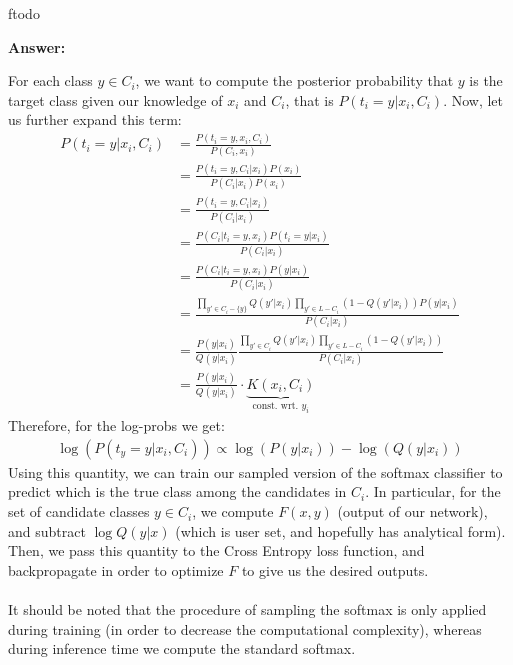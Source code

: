 ƒtodo\documentclass{article}
\newenvironment{QandA}{\begin{enumerate}[label=\arabic*.]}{\end{enumerate}}
\newenvironment{ListAlph}{\begin{enumerate}[label=(\alph*)]}{\end{enumerate}}
\newenvironment{answer}{\par\normalfont \textbf{Answer:}}{}
\newcommand{\g}{\vert}
\begin{document}
\begin{QandA}
\begin{answer}
\begin{ListAlph}
            For each class $y \in C_i$, we want to compute the posterior probability that $y$ is the target class given our knowledge of $x_i$ and $C_i$, that is $P(t_i = y \g x_i, C_i)$. Now, let us further expand this term:
            \begin{align*}
                P(t_i = y \g x_i, C_i) &= \frac{P(t_i = y, x_i, C_i)}{P(C_i, x_i)} \\
                &= \frac{P(t_i = y, C_i \g x_i) P(x_i)}{P(C_i \g x_i) P(x_i)} \\
                &= \frac{P(t_i = y, C_i \g x_i)}{P(C_i \g x_i)} \\
                &= \frac{P(C_i \g t_i = y, x_i) P(t_i = y \g x_i)}{P(C_i \g x_i)} \\
                &= \frac{P(C_i \g t_i = y, x_i) P(y \g x_i)}{P(C_i \g x_i)} \\
                &= \frac{\displaystyle \prod_{y' \in C_i - \{y\}} Q(y' \g x_i) \prod_{y' \in L - C_i} (1 - Q(y' \g x_i)) P(y \g x_i) }{P(C_i \g x_i)} \\
                &= \frac{P(y \g x_i)}{Q(y \g x_i)} \frac{\displaystyle \prod_{y' \in C_i } Q(y' \g x_i) \prod_{y' \in L - C_i} (1 - Q(y' \g x_i)) }{P(C_i \g x_i)} \\
                &= \frac{P(y \g x_i)}{Q(y \g x_i)} \cdot \underbrace{K(x_i, C_i)}_{\text{const. wrt. } y_i}
            \end{align*} 
            Therefore, for the log-probs we get:
            \begin{align*}
                \log (P(t_y = y \g x_i, C_i)) \propto \log (P(y \g x_i)) - \log (Q(y \g x_i)) 
            \end{align*}
            Using this quantity, we can train our sampled version of the softmax classifier to predict which is the true class among the candidates in $C_i$. In particular, for the set of candidate classes $y \in C_i$, we compute $F(x, y)$ (output of our network), and subtract $\log Q(y \g x)$ (which is user set, and hopefully has analytical form). Then, we pass this quantity to the Cross Entropy loss function, and backpropagate in order to optimize $F$ to give us the desired outputs. \\\\
            It should be noted that the procedure of sampling the softmax is only applied during training (in order to decrease the computational complexity), whereas during inference time we compute the standard softmax.


\end{ListAlph}
\end{answer}
\end{QandA}
\end{document}
